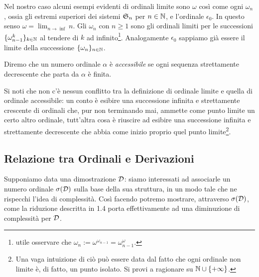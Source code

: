 		Nel nostro caso alcuni esempi evidenti di ordinali limite sono $\omega$ così come ogni $\omega_{n}$, ossia gli estremi superiori dei sistemi $\mathfrak{S}_{n}$ per $n\in\mathbb{N}$, e l'ordinale $\epsilon_{0}$.
		In questo senso $\omega=\lim_{n \to \inf} n$. Gli $\omega_{n}$ con $n\geq1$ sono gli ordinali limiti per le successioni $\{\omega_{n-1}^k\}_{k\in\mathbb{N}}$ al tendere di $k$ ad infinito\footnote{\Egrave utile osservare che $\omega_{n}:=\omega^{\omega_{n-1}}=\omega_{n-1}^{\omega}$.}. Analogamente $\epsilon_{0}$ sappiamo già essere il limite della successione $\{\omega_{n}\}_{n\in\mathbb{N}}$. 
	\begin{defin}[Accessibilità]
		Diremo che un numero ordinale $\alpha$ è \emph{accessibile} se ogni sequenza strettamente decrescente che parta da $\alpha$ è finita.
	\end{defin}
	\begin{comment}
		Consideriamo la definizione di \emph{accessibilità} per un dato numero ordinale solo quando abbiamo effettivamente visto, o dimostrato costruttivamente, che quel dato numero ordinale è accessibile, i.e. ha la proprietà specificata nella dimostrazione. Non diamo quindi una definizione generale della nozione di accessibilità.
	\end{comment}	
		Si noti che non c'è nessun conflitto tra la definizione di ordinale limite e quella di ordinale accessibile: un conto è esibire una successione infinita e strettamente crescente di ordinali che, pur non terminando mai, ammette come punto limite un certo altro ordinale, tutt'altra cosa è riuscire ad esibire una successione infinita e strettamente decrescente che abbia come inizio proprio quel punto limite\footnote{Una vaga intuizione di ciò può essere data dal fatto che ogni ordinale non limite è, di fatto, un punto isolato. Si provi a ragionare su $\mathbb{N}\cup\{+\infty\}$.}.
	\subsection{Relazione tra Ordinali e Derivazioni}
		Supponiamo data una dimostrazione $\mathcal{D}$: siamo interessati ad associarle un numero ordinale $\sigma(\mathcal{D})$ sulla base della sua struttura, in un modo tale che ne rispecchi l'idea di complessità. Così facendo potremo mostrare, attraverso $\sigma(\mathcal{D})$, come la riduzione descritta in 1.4 porta effettivamente ad una diminuzione di complessità per $\mathcal{D}$.
		
